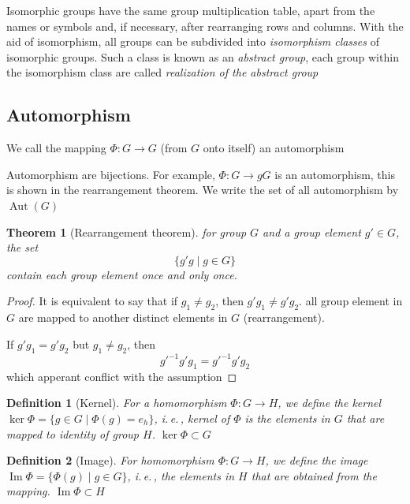\documentclass{amsart}
\newtheorem{definition}{Definition}
\newtheorem{theorem}{Theorem}
\DeclareMathOperator{\Aut}{Aut}
\DeclareMathOperator{\Image}{Im}
\begin{document}
Isomorphic groups have the same group multiplication table, apart from the names or symbols and, if necessary, after 
rearranging rows and columns. 
With the aid of isomorphism, all groups can be subdivided into \emph{isomorphism classes} of isomorphic groups. 
Such a class is known as an \emph{abstract group}, each group within the isomorphism class are called 
\emph{realization of the abstract group}

\subsection*{Automorphism}
    We call the mapping $\Phi\colon G \to G$ (from $G$ onto itself) an automorphism

Automorphism are bijections. For example, $\Phi\colon G \to gG$ is an automorphism, 
this is shown in the rearrangement theorem. We write the set of all automorphism by $\Aut(G)$ 

\vspace{10pt}

\begin{theorem}[Rearrangement theorem]
    for group $G$ and a group element $g'\in G$, the set 
    \[\{g'g \mid g \in G\}\]
    contain each group element once and only once.
\end{theorem}
\begin{proof}
    It is equivalent to say that if $g_1 \neq g_2$, then $g'g_1 \neq g'g_2$. all group element in $G$ are mapped 
    to another distinct elements in $G$ (rearrangement).

    If $g'g_1 = g'g_2$ but $g_1 \neq g_2$, then 
    \[ g'^{-1}g'g_1 = g'^{-1}g'g_2 \] which apperant conflict with the assumption
\end{proof}

\vspace{10pt}

\begin{definition}
    [Kernel] For a homomorphism $\Phi\colon G \to H$, we define the kernel $\ker\Phi = \{g\in G\mid \Phi(g) = e_h \}$, i.\,e.\,,
    kernel of $\Phi$ is the elements in $G$ that are mapped to identity of group $H$. $\ker\Phi \subset G$
\end{definition}

\begin{definition}
    [Image] For homomorphism $\Phi\colon G \to H$, we define the image $\Image\Phi = \{ \Phi(g) \mid g \in G \}$, i.\,e.\,,
    the elements in $H$ that are obtained from the mapping. $\Image\Phi \subset H$
\end{definition}
\end{document}
